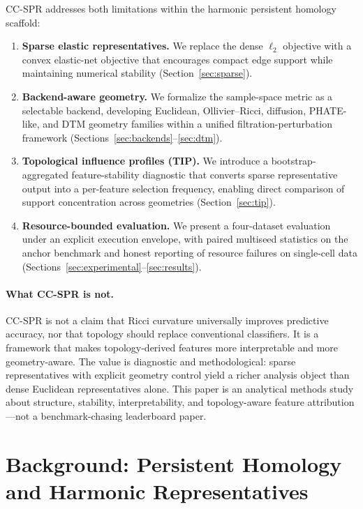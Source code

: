 \documentclass[11pt]{article}
\begin{document}
CC-SPR addresses both limitations within the harmonic persistent homology scaffold:
\begin{enumerate}[leftmargin=1.5em]
\item \textbf{Sparse elastic representatives.} We replace the dense $\ell_2$ objective with a convex elastic-net objective that encourages compact edge support while maintaining numerical stability (Section~\ref{sec:sparse}).
\item \textbf{Backend-aware geometry.} We formalize the sample-space metric as a selectable backend, developing Euclidean, Ollivier--Ricci, diffusion, PHATE-like, and DTM geometry families within a unified filtration-perturbation framework (Sections~\ref{sec:backends}--\ref{sec:dtm}).
\item \textbf{Topological influence profiles (TIP).} We introduce a bootstrap-aggregated feature-stability diagnostic that converts sparse representative output into a per-feature selection frequency, enabling direct comparison of support concentration across geometries (Section~\ref{sec:tip}).
\item \textbf{Resource-bounded evaluation.} We present a four-dataset evaluation under an explicit execution envelope, with paired multiseed statistics on the anchor benchmark and honest reporting of resource failures on single-cell data (Sections~\ref{sec:experimental}--\ref{sec:results}).
\end{enumerate}

\paragraph{What CC-SPR is not.}
CC-SPR is not a claim that Ricci curvature universally improves predictive accuracy, nor that topology should replace conventional classifiers.
It is a framework that makes topology-derived features more interpretable and more geometry-aware.
The value is diagnostic and methodological: sparse representatives with explicit geometry control yield a richer analysis object than dense Euclidean representatives alone.
This paper is an analytical methods study about structure, stability, interpretability, and topology-aware feature attribution---not a benchmark-chasing leaderboard paper.

\section{Background: Persistent Homology and Harmonic Representatives}
\label{sec:background}
\end{document}
